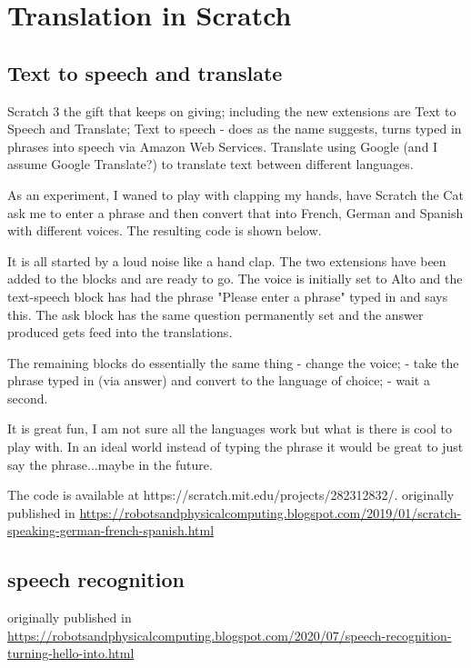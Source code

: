 \chapter{Translation in Scratch}

\section{Text to speech and translate}
Scratch 3 the gift that keeps on giving; including the new extensions are Text to Speech and Translate; Text to speech - does as the name suggests, turns typed in phrases into speech via Amazon Web Services. Translate using Google (and I assume Google Translate?) to translate text between different languages.





As an experiment, I waned to play with clapping my hands, have Scratch the Cat ask me to enter a phrase and then convert that into French, German and Spanish with different voices. The resulting code is shown below.




It is all started by a loud noise like a hand clap. The two extensions have been added to the blocks and are ready to go. The voice is initially set to Alto and the text-speech block has had the phrase "Please enter a phrase" typed in and says this. The ask block has the same question permanently set and the answer produced gets feed into the translations. 

The remaining blocks do essentially the same thing
- change the voice;
- take the phrase typed in (via answer) and convert to the language of choice;
- wait a second.


It is great fun, I am not sure all the languages work but what is there is cool to play with. In an ideal world instead of typing the phrase it would be great to just say the phrase...maybe in the future. 

The code is available at https://scratch.mit.edu/projects/282312832/.
originally published in \url{https://robotsandphysicalcomputing.blogspot.com/2019/01/scratch-speaking-german-french-spanish.html}

\section{speech recognition}
originally published in \url{https://robotsandphysicalcomputing.blogspot.com/2020/07/speech-recognition-turning-hello-into.html}

